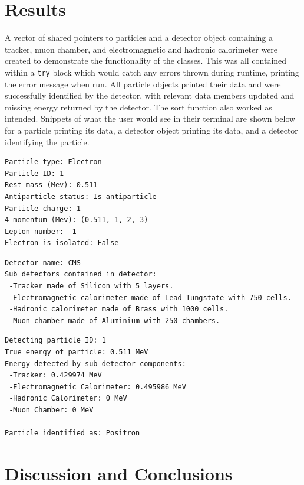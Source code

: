 \documentclass[12pt]{report}
\begin{document}
\section{Results}

A vector of shared pointers to particles and a detector object containing a tracker, muon chamber, and electromagnetic and hadronic calorimeter were created to demonstrate the functionality of the classes. This was all contained within a \texttt{try} block which would catch any errors thrown during runtime, printing the error message when run. All particle objects printed their data and were successfully identified by the detector, with relevant data members updated and missing energy returned by the detector. The sort function also worked as intended. Snippets of what the user would see in their terminal are shown below for a particle printing its data, a detector object printing its data, and a detector identifying the particle.
\begin{verbatim}
Particle type: Electron
Particle ID: 1
Rest mass (Mev): 0.511
Antiparticle status: Is antiparticle
Particle charge: 1
4-momentum (Mev): (0.511, 1, 2, 3)
Lepton number: -1
Electron is isolated: False
\end{verbatim}
\begin{verbatim}
Detector name: CMS
Sub detectors contained in detector:
 -Tracker made of Silicon with 5 layers.
 -Electromagnetic calorimeter made of Lead Tungstate with 750 cells.
 -Hadronic calorimeter made of Brass with 1000 cells.
 -Muon chamber made of Aluminium with 250 chambers.
\end{verbatim}
\begin{verbatim}
Detecting particle ID: 1
True energy of particle: 0.511 MeV
Energy detected by sub detector components:
 -Tracker: 0.429974 MeV
 -Electromagnetic Calorimeter: 0.495986 MeV
 -Hadronic Calorimeter: 0 MeV
 -Muon Chamber: 0 MeV

Particle identified as: Positron
\end{verbatim}

\section{Discussion and Conclusions}
\end{document}
